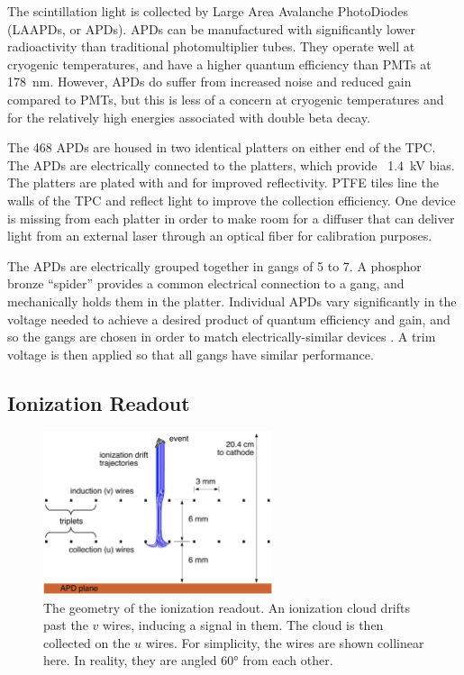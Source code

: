 \documentclass[herrin-thesis.tex]{subfiles}
\begin{document}
The scintillation light is collected by Large Area Avalanche PhotoDiodes (LAAPDs, or APDs). APDs can be manufactured with significantly lower radioactivity than traditional photomultiplier tubes. They operate well at cryogenic temperatures, and have a higher quantum efficiency than PMTs at \SI{178}{\nm}. However, APDs do suffer from increased noise and reduced gain compared to PMTs, but this is less of a concern at cryogenic temperatures and for the relatively high energies associated with double beta decay.

The 468 APDs are housed in two identical platters on either end of the TPC. The APDs are electrically connected to the platters, which provide \about~\SI{1.4}{\kV} bias. The platters are plated with  and  for improved reflectivity. PTFE tiles line the walls of the TPC and reflect light to improve the collection efficiency. One device is missing from each platter in order to make room for a diffuser that can deliver light from an external laser through an optical fiber for calibration purposes.

The APDs are electrically grouped together in gangs of 5 to 7. A phosphor bronze ``spider'' provides a common electrical connection to a gang, and mechanically holds them in the platter. Individual APDs vary significantly in the voltage needed to achieve a desired product of quantum efficiency and gain, and so the gangs are chosen in order to match electrically-similar devices \cite{Neilson:2009fk}. A trim voltage is then applied so that all gangs have similar performance.

\subsection{Ionization Readout}

\begin{figure}[htbp]
\centering
\includegraphics[width=0.6\textwidth]{./figures/detector_wire_geometry.pdf}
\caption[Geometry of the ionization readout wire planes]{The geometry of the ionization readout. An ionization cloud drifts past the \(v\) wires, inducing a signal in them. The cloud is then collected on the \(u\) wires. For simplicity, the wires are shown collinear here. In reality, they are angled \ang{60} from each other.}
\label{fig:detector_wire_geometry}
\end{figure}
\end{document}
